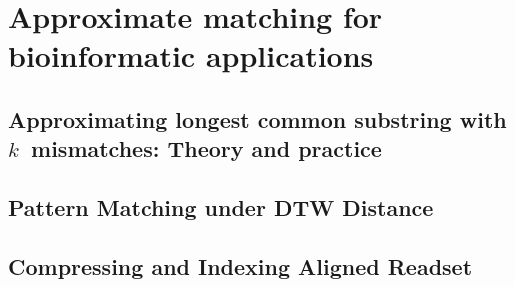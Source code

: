 \part{Approximate matching for bioinformatic applications}

\mainmatter
\chapter{Approximating longest common substring with \texorpdfstring{$k$}{k}~mismatches: Theory and practice}\label{chap:LCS}
%
\mainmatter
\chapter{Pattern Matching under DTW Distance}\label{chap:DTW}
%
\mainmatter
\chapter{Compressing and Indexing Aligned Readset}\label{chap:XBWT}
%